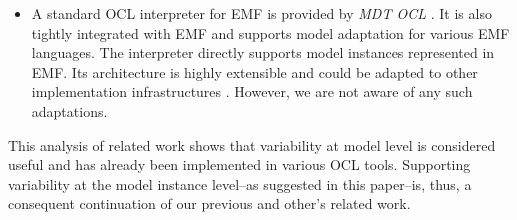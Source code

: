 \begin{itemize}
\item A standard OCL interpreter for EMF is provided by \emph{MDT OCL}
\cite{WWW:MDT}. It is also tightly integrated with EMF and supports 
model adaptation for various EMF languages. The interpreter directly supports
model instances represented in EMF. Its architecture is highly extensible
and could be adapted to other implementation
infrastructures  \cite{damus:EclipseCon08}. 
However, we are not aware of any such adaptations.

\end{itemize}

This analysis of related work shows that variability at model level is
considered useful and has already been implemented in various OCL tools.
Supporting variability at the model instance level--as suggested in this paper--is, 
thus, a consequent continuation of our previous
and other's related work.